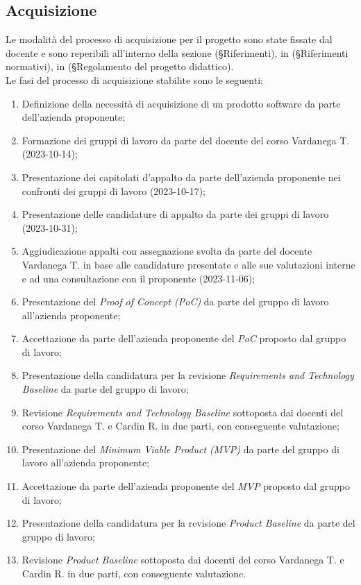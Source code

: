 \documentclass[10pt, a4paper]{article}
\begin{document}
\subsection{Acquisizione}
Le modalità del processo di acquisizione per il progetto sono state fissate dal docente e sono reperibili all'interno della sezione 
(\S Riferimenti), in (\S Riferimenti normativi), in (\S Regolamento del progetto didattico).\\
Le fasi del processo di acquisizione stabilite sono le seguenti:
\begin{enumerate}
    \item Definizione della necessità di acquisizione di un prodotto software da parte dell'azienda proponente;
    \item Formazione dei gruppi di lavoro da parte del docente del corso Vardanega T.(2023-10-14);
    \item Presentazione dei capitolati d'appalto da parte dell'azienda proponente nei confronti dei gruppi di lavoro (2023-10-17);
    \item Presentazione delle candidature di appalto da parte dei gruppi di lavoro (2023-10-31);
    \item Aggiudicazione appalti con assegnazione svolta da parte del docente Vardanega T. in base alle candidature presentate e alle sue 
    valutazioni interne e ad una consultazione con il proponente (2023-11-06);
    \item Presentazione del \textit{Proof of Concept (PoC)} da parte del gruppo di lavoro all'azienda proponente;
    \item Accettazione da parte dell'azienda proponente del \textit{PoC} proposto dal gruppo di lavoro;
    \item Presentazione della candidatura per la revisione \textit{Requirements and Technology Baseline} da parte del gruppo di lavoro;
    \item Revisione \textit{Requirements and Technology Baseline} sottoposta dai docenti del corso Vardanega T. e Cardin R. in due parti, con 
    conseguente valutazione;
    \item Presentazione del \textit{Minimum Viable Product (MVP)} da parte del gruppo di lavoro all'azienda proponente;
    \item Accettazione da parte dell'azienda proponente del \textit{MVP} proposto dal gruppo di lavoro;
    \item Presentazione della candidatura per la revisione \textit{Product Baseline} da parte del gruppo di lavoro;
    \item Revisione \textit{Product Baseline} sottoposta dai docenti del corso Vardanega T. e Cardin R. in due parti, con conseguente valutazione.
\end{enumerate}
\end{document}
